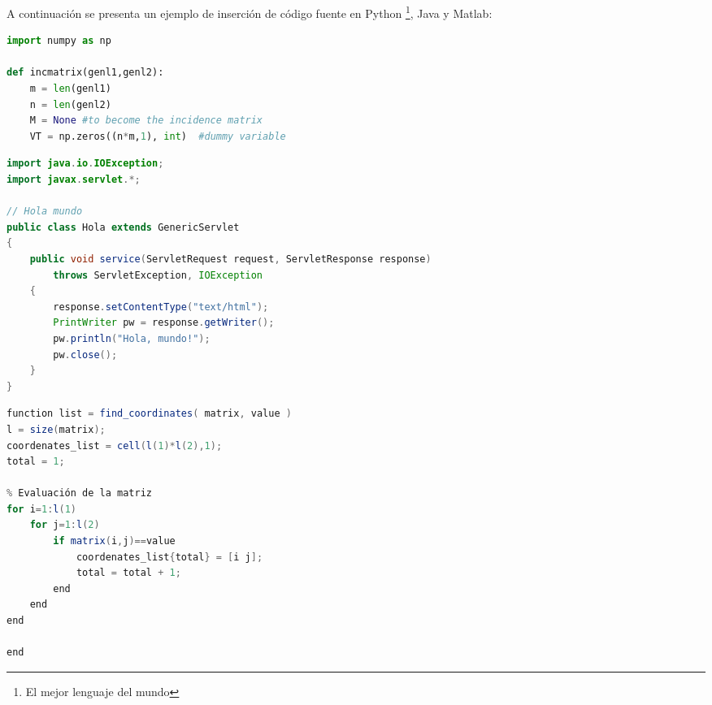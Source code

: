 		\begin{multicols}{2}
		
			\lipsum[114]
			
			\vspace{-0.1cm}
			
			\lipsum[5]
			
		\end{multicols}
		
		\lipsum[1]
		
		
\newpage	



	A continuación se presenta un ejemplo de inserción de código fuente en Python \footnote{ El mejor lenguaje del mundo}, Java y Matlab:

\lstset{style=Python}
\begin{lstlisting}[language=Python, caption=Ejemplo en Python]
import numpy as np
 
def incmatrix(genl1,genl2):
    m = len(genl1)
    n = len(genl2)
    M = None #to become the incidence matrix
    VT = np.zeros((n*m,1), int)  #dummy variable
\end{lstlisting}

\lstset{style=Java}
\begin{lstlisting}[language=Java, caption=Ejemplo en Java]
import java.io.IOException; 
import javax.servlet.*;

// Hola mundo
public class Hola extends GenericServlet 
{
    public void service(ServletRequest request, ServletResponse response)
        throws ServletException, IOException
    {
        response.setContentType("text/html");
        PrintWriter pw = response.getWriter();
        pw.println("Hola, mundo!");
        pw.close();
    }
}
\end{lstlisting}

\lstset{style=Matlab}
\begin{lstlisting}[language=Java, caption=Ejemplo en Matlab]
function list = find_coordinates( matrix, value )
l = size(matrix);
coordenates_list = cell(l(1)*l(2),1);
total = 1;

% Evaluación de la matriz
for i=1:l(1)
    for j=1:l(2)
        if matrix(i,j)==value
            coordenates_list{total} = [i j];
            total = total + 1;
        end
    end
end

end
\end{lstlisting}


